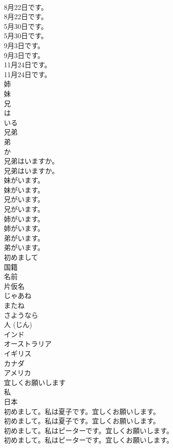 \documentclass[8pt]{extreport}
\begin{document}
\begin{CJK}{UTF8}{min}
\\	8月22日です。	
\\	8月22日です。 
\\	5月30日です。	
\\	5月30日です。 
\\	9月3日です。	
\\	9月3日です。 
\\	11月24日です。	
\\	11月24日です。 
\\	姉
\\	妹
\\	兄
\\	は
\\	いる
\\	兄弟
\\	弟
\\	か
\\	兄弟はいますか。	
\\	兄弟はいますか。 
\\	妹がいます。	
\\	妹がいます。 
\\	兄がいます。	
\\	兄がいます。 
\\	姉がいます。	
\\	姉がいます。 
\\	弟がいます。	
\\	弟がいます。 
\\	初めまして
\\	国籍
\\	名前
\\	片仮名
\\	じゃあね
\\	またね
\\	さようなら
\\	人 (じん)
\\	インド
\\	オーストラリア
\\	イギリス
\\	カナダ
\\	アメリカ
\\	宜しくお願いします
\\	私
\\	日本
\\	初めまして。私は夏子です。宜しくお願いします。	
\\	初めまして。私は夏子です。宜しくお願いします。 
\\	初めまして。私はピーターです。宜しくお願いします。	
\\	初めまして。私はピーターです。宜しくお願いします。 

\end{CJK}
\end{document}
